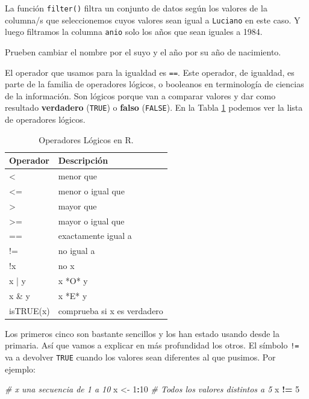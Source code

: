 \documentclass[]{book}
\newenvironment{Shaded}{\begin{snugshade}}{\end{snugshade}}
\newcommand{\CommentTok}[1]{\textcolor[rgb]{0.56,0.35,0.01}{\textit{#1}}}
\newcommand{\DecValTok}[1]{\textcolor[rgb]{0.00,0.00,0.81}{#1}}
\newcommand{\NormalTok}[1]{#1}
\newcommand{\OperatorTok}[1]{\textcolor[rgb]{0.81,0.36,0.00}{\textbf{#1}}}
\newcommand{\StringTok}[1]{\textcolor[rgb]{0.31,0.60,0.02}{#1}}
\theoremstyle{definition}
\theoremstyle{definition}
\theoremstyle{definition}
\theoremstyle{remark}
\let\BeginKnitrBlock\begin \let\EndKnitrBlock\end
\begin{document}
La función \texttt{filter()} filtra un conjunto de datos según los
valores de la columna/s que seleccionemos cuyos valores sean igual a
\texttt{Luciano} en este caso. Y luego filtramos la columna
\texttt{anio} solo los años que sean iguales a 1984.

\BeginKnitrBlock{exercise}
\protect\hypertarget{exr:ejercicio-5}{}{\label{exr:ejercicio-5} }Prueben
cambiar el nombre por el suyo y el año por su año de nacimiento.
\EndKnitrBlock{exercise}

El operador que usamos para la igualdad es \texttt{==}. Este operador,
de igualdad, es parte de la familia de operadores lógicos, o booleanos
en terminología de ciencias de la información. Son lógicos porque van a
comparar valores y dar como resultado \textbf{verdadero} (\texttt{TRUE})
o \textbf{falso} (\texttt{FALSE}). En la Tabla \ref{tab:tabla-logicos}
podemos ver la lista de operadores lógicos.

\begin{table}

\caption{\label{tab:tabla-logicos}Operadores Lógicos en R.}
\centering
\begin{tabular}[t]{l|l}
\hline
Operador & Descripción\\
\hline
< & menor que\\
\hline
<= & menor o igual que\\
\hline
> & mayor que\\
\hline
>= & mayor o igual que\\
\hline
== & exactamente igual a\\
\hline
!= & no igual a\\
\hline
!x & no x\\
\hline
x | y & x *O* y\\
\hline
x \& y & x *E* y\\
\hline
isTRUE(x) & comprueba si x es verdadero\\
\hline
\end{tabular}
\end{table}

Los primeros cinco son bastante sencillos y los han estado usando desde
la primaria. Así que vamos a explicar en más profundidad los otros. El
símbolo \texttt{!=} va a devolver \texttt{TRUE} cuando los valores sean
diferentes al que pusimos. Por ejemplo:

\begin{Shaded}
\begin{Highlighting}[]
\CommentTok{# x una secuencia de 1 a 10}
\NormalTok{x <-}\StringTok{ }\DecValTok{1}\OperatorTok{:}\DecValTok{10}
\CommentTok{# Todos los valores distintos a 5}
\NormalTok{x }\OperatorTok{!=}\StringTok{ }\DecValTok{5}
\end{Highlighting}
\end{Shaded}
\end{document}
